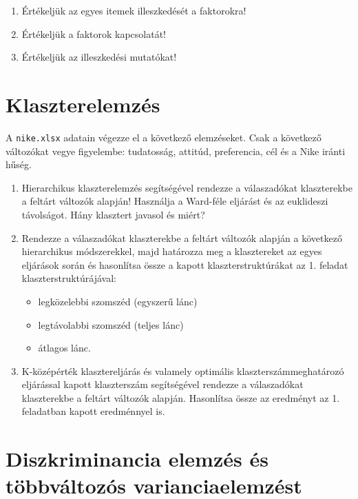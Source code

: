\documentclass[
  letterpaper,
]{krantz}
\providecommand{\tightlist}{%
  \setlength{\itemsep}{0pt}\setlength{\parskip}{0pt}}\usepackage{longtable,booktabs,array}
\begin{document}
\begin{enumerate}
\def\labelenumi{\arabic{enumi}.}
\tightlist
\item
  Értékeljük az egyes itemek illeszkedését a faktorokra!
\item
  Értékeljük a faktorok kapcsolatát!
\item
  Értékeljük az illeszkedési mutatókat!
\end{enumerate}

\hypertarget{klaszterelemzuxe9s}{%
\chapter{Klaszterelemzés}\label{klaszterelemzuxe9s}}

A \texttt{nike.xlsx} adatain végezze el a következő elemzéseket. Csak a
következő változókat vegye figyelembe: tudatosság, attitúd, preferencia,
cél és a Nike iránti hűség.

\begin{enumerate}
\def\labelenumi{\arabic{enumi}.}
\tightlist
\item
  Hierarchikus klaszterelemzés segítségével rendezze a válaszadókat
  klaszterekbe a feltárt változók alapján! Használja a Ward-féle
  eljárást és az euklideszi távolságot. Hány klasztert javasol és
  miért?\\
\item
  Rendezze a válaszadókat klaszterekbe a feltárt változók alapján a
  következő hierarchikus módszerekkel, majd határozza meg a klasztereket
  az egyes eljárások során és hasonlítsa össze a kapott
  klaszterstruktúrákat az 1. feladat klaszterstruktúrájával:

  \begin{itemize}
  \tightlist
  \item
    legközelebbi szomszéd (egyszerű lánc)
  \item
    legtávolabbi szomszéd (teljes lánc)
  \item
    átlagos lánc.
  \end{itemize}
\item
  K-középérték klasztereljárás és valamely optimális
  klaszterszámmeghatározó eljárással kapott klaszterszám segítségével
  rendezze a válaszadókat klaszterekbe a feltárt változók alapján.
  Hasonlítsa össze az eredményt az 1. feladatban kapott eredménnyel is.
\end{enumerate}

\hypertarget{diszkriminancia-elemzuxe9s-uxe9s-tuxf6bbvuxe1ltozuxf3s-varianciaelemzuxe9st}{%
\chapter{Diszkriminancia elemzés és többváltozós
varianciaelemzést}\label{diszkriminancia-elemzuxe9s-uxe9s-tuxf6bbvuxe1ltozuxf3s-varianciaelemzuxe9st}}
\end{document}
